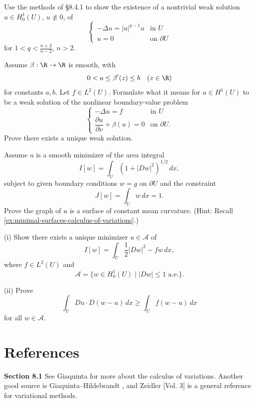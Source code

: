 \begin{exercise}
Use the methods of \S8.4.1 to show the existence of a nontrivial weak solution $u \in H_0^1(U)$, $u \not\equiv 0$, of
\[
\begin{cases} -\Delta u = |u|^{q-1}u & \text{in } U \\ u = 0 & \text{on } \partial U \end{cases}
\]
for $1 < q < \frac{n+2}{n-2}$, $n > 2$.
\end{exercise}

\begin{exercise}
Assume $\beta: \R \to \R$ is smooth, with
\[
0 < a \le \beta'(z) \le b \quad (z \in \R)
\]
for constants $a, b$. Let $f \in L^2(U)$. Formulate what it means for $u \in H^1(U)$ to be a weak solution of the nonlinear boundary-value problem
\[
\begin{cases}
-\Delta u = f & \text{in } U \\
\dfrac{\partial u}{\partial \nu} + \beta(u) = 0 & \text{on } \partial U.
\end{cases}
\]
Prove there exists a unique weak solution.
\end{exercise}

\begin{exercise}
Assume $u$ is a smooth minimizer of the area integral
\[
I[w] = \int_U (1 + |Dw|^2)^{1/2}\, dx,
\]
subject to given boundary conditions $w = g$ on $\partial U$ and the constraint
\[
J[w] = \int_U w\, dx = 1.
\]
Prove the graph of $u$ is a surface of constant mean curvature. (Hint: Recall \cref{ex:minimal-surfaces-calculus-of-variations}.)
\end{exercise}

\begin{exercise}
(i) Show there exists a unique minimizer $u \in \mathcal{A}$ of
\[
I[w] = \int_U \frac{1}{2}|Dw|^2 - fw\, dx,
\]
where $f \in L^2(U)$ and
\[
\mathcal{A} = \{w \in H_0^1(U) \mid |Dw| \le 1 \text{ a.e.}\}.
\]

(ii) Prove
\[
\int_U Du \cdot D(w - u)\, dx \ge \int_U f(w - u)\, dx
\]
for all $w \in \mathcal{A}$.
\end{exercise}

\section{References}
\label{sec:calculus-of-variations-references}

\textbf{Section 8.1} See Giaquinta \cite{Giaquinta1983} for more about the calculus of variations. Another good source is Giaquinta--Hildebrandt \cite{GiaquintaHildebrandt1996}, and Zeidler \cite{Zeidler1985}[Vol. 3] is a general reference for variational methods.

